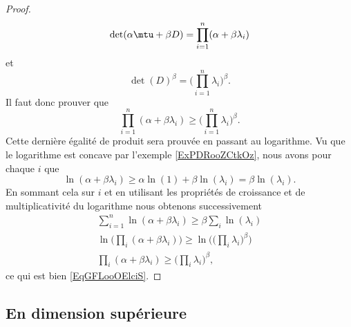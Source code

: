 \begin{proof}
    \begin{equation}
        \det(\alpha\mtu+\beta D)=\prod_{i=1}^n(\alpha+\beta\lambda_i)
    \end{equation}
    et 
    \begin{equation}
        \det(D)^{\beta}=\big( \prod_{i=1}^{n}\lambda_i \big)^{\beta}.
    \end{equation}
    Il faut donc prouver que
    \begin{equation}\label{EqGFLooOElciS}    
        \prod_{i=1}^n(\alpha+\beta\lambda_i)\geq \big( \prod_{i=1}^n\lambda_i \big)^{\beta}.
    \end{equation}
    Cette dernière égalité de produit sera prouvée en passant au logarithme. Vu que le logarithme est concave par l'exemple \ref{ExPDRooZCtkOz}, nous avons pour chaque \( i\) que
    \begin{equation}
        \ln(\alpha+\beta\lambda_i)\geq \alpha\ln(1)+\beta\ln(\lambda_i)=\beta\ln(\lambda_i).
    \end{equation}
    En sommant cela sur \( i\) et en utilisant les propriétés de croissance et de multiplicativité du logarithme nous obtenons successivement
    \begin{subequations}
        \begin{align}
            \sum_{i=1}^n\ln(\alpha+\beta\lambda_i)\geq \beta\sum_i\ln(\lambda_i)\\
            \ln\big( \prod_i(\alpha+\beta\lambda_i) \big)\geq\ln\Big( \big( \prod_i\lambda_i \big)^{\beta} \Big)\\
            \prod_i(\alpha+\beta\lambda_i)\geq\big( \prod_i\lambda_i \big)^{\beta},
        \end{align}
    \end{subequations}
    ce qui est bien \eqref{EqGFLooOElciS}.
\end{proof}

\subsection{En dimension supérieure}

